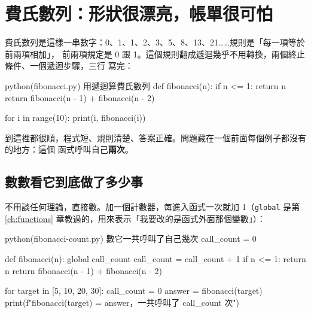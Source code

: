 \section{費氏數列：形狀很漂亮，帳單很可怕}
\label{sec:fibonacci-cost}

費氏數列是這樣一串數字：0、1、1、2、3、5、8、13、21……規則是「每一項等於前兩項相加」，
前兩項規定是 0 跟 1。這個規則翻成遞迴幾乎不用轉換，兩個終止條件、一個遞迴步驟，三行
寫完：

\begin{example}{python}{(fibonacci.py) 用遞迴算費氏數列}
def fibonacci(n):
    if n <= 1:
        return n
    return fibonacci(n - 1) + fibonacci(n - 2)


for i in range(10):
    print(i, fibonacci(i))
\end{example}


到這裡都很順，程式短、規則清楚、答案正確。問題藏在一個前面每個例子都沒有的地方：這個
函式呼叫自己\textbf{兩次}。

\subsection*{數數看它到底做了多少事}

不用談任何理論，直接數。加一個計數器，每進入函式一次就加 1（\texttt{global} 是第
\ref{ch:functions} 章教過的，用來表示「我要改的是函式外面那個變數」）：

\begin{example}{python}{(fibonacci-count.py) 數它一共呼叫了自己幾次}
call_count = 0


def fibonacci(n):
    global call_count
    call_count = call_count + 1
    if n <= 1:
        return n
    return fibonacci(n - 1) + fibonacci(n - 2)


for target in [5, 10, 20, 30]:
    call_count = 0
    answer = fibonacci(target)
    print(f"fibonacci({target}) = {answer}，一共呼叫了 {call_count} 次")
\end{example}


